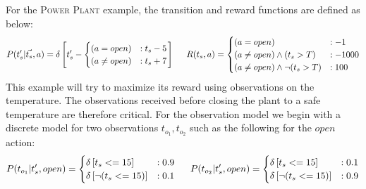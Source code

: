\documentclass{article} %
\begin{document}
For the \textsc{Power Plant} example, the transition and reward functions are defined as below:
{\footnotesize
\begin{align}
P(t_s'|\vec{t_s},a)= \delta\left[ t_s' - 
\begin{cases}
 (a=open) &: t_s - 5 \\ 
(a \neq open) &: t_s + 7 \\
\end{cases}
\right]\nonumber
\hspace{5mm}
R(t_s,a) = 
\begin{cases}
 (a=open) &: -1 \\
(a \neq open)\wedge (t_s>T) &: -1000 \\
(a \neq open)\wedge \neg(t_s>T) &: 100 \\
\end{cases}\nonumber
\end{align}
}
This example will try to maximize its reward using observations on the temperature. The observations received before closing the plant to a safe temperature are therefore critical.  For the observation model we begin with a discrete model for two observations $t_{o_1},t_{o_2}$ such as the following for the $open$ action:  
{\footnotesize
\begin{align}
P(t_{o_1}|t_s',open) = 
\begin{cases}
 \delta\left[ t_s <= 15 \right] &: 0.9 \\
 \delta\left[ \neg (t_s <= 15)\right] &: 0.1 \\
\end{cases}\nonumber
\hspace{5mm}
P(t_{o_2}|t_s',open) = 
\begin{cases}
 \delta\left[ t_s <= 15 \right] &: 0.1 \\
 \delta\left[ \neg (t_s <= 15)\right] &: 0.9 \\
\end{cases}\nonumber
\end{align}
}
\end{document}
